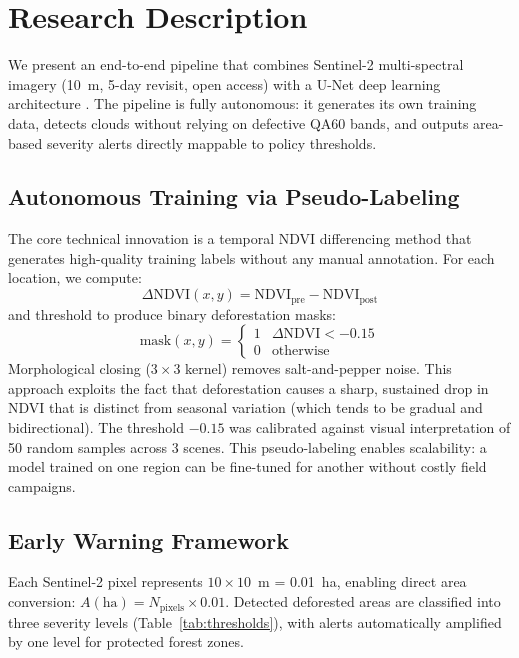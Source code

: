 \documentclass[10pt,a4paper,onecolumn]{article}
\begin{document}
\section{Research Description}
We present an end-to-end pipeline that combines Sentinel-2
multi-spectral imagery (10~m, 5-day revisit, open access) \cite{drusch2012sentinel2} with a
U-Net deep learning architecture \cite{ronneberger2015unet}. The pipeline is fully autonomous:
it generates its own training data, detects clouds without relying
on defective QA60 bands, and outputs area-based severity alerts
directly mappable to policy thresholds.

\subsection{Autonomous Training via Pseudo-Labeling}
The core technical innovation is a temporal NDVI differencing
method that generates high-quality training labels without any
manual annotation. For each location, we compute:
\begin{equation}
\Delta\text{NDVI}(x,y) = \text{NDVI}_{\text{pre}} - \text{NDVI}_{\text{post}}
\end{equation}
and threshold to produce binary deforestation masks:
\begin{equation}
\text{mask}(x,y) = 
\begin{cases}
1 & \Delta\text{NDVI} < -0.15 \\
0 & \text{otherwise}
\end{cases}
\end{equation}
Morphological closing ($3\times3$ kernel) removes salt-and-pepper
noise. This approach exploits the fact that deforestation causes
a sharp, sustained drop in NDVI that is distinct from seasonal
variation (which tends to be gradual and bidirectional). The
threshold $-0.15$ was calibrated against visual interpretation of
50 random samples across 3 scenes. This pseudo-labeling enables
scalability: a model trained on one region can be fine-tuned for
another without costly field campaigns.

\subsection{Early Warning Framework}
Each Sentinel-2 pixel represents $10\times10$~m = 0.01~ha, enabling
direct area conversion: $A(\text{ha}) = N_{\text{pixels}} \times 0.01$.
Detected deforested areas are classified into three severity levels
(Table~\ref{tab:thresholds}), with alerts automatically amplified
by one level for protected forest zones.
\end{document}
